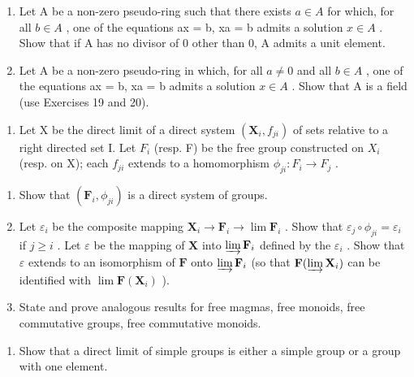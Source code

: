 \begin{enumerate}
\def\labelenumi{\arabic{enumi}.}
\setcounter{enumi}{19}
\item
  Let A be a non-zero pseudo-ring such that there exists \(a \in A\) for which, for all \(b \in A\) , one of the equations ax = b, xa = b admits a solution \(x \in A\) . Show that if A has no divisor of 0 other than 0, A admits a unit element.
\item
  Let A be a non-zero pseudo-ring in which, for all \(a \neq 0\) and all \(b \in A\) , one of the equations ax = b, xa = b admits a solution \(x \in A\) . Show that A is a field (use Exercises 19 and 20).
\end{enumerate}

\BourbakiExercisesSection

\begin{enumerate}
\def\labelenumi{\arabic{enumi}.}
\tightlist
\item
  Let X be the direct limit of a direct system \((\mathbf{X}_{i}, f_{ji})\) of sets relative to a right directed set I. Let \(F_{i}\) (resp. F) be the free group constructed on \(X_{i}\) (resp. on X); each \(f_{ji}\) extends to a homomorphism \(\phi_{ji}: F_{i} \to F_{j}\) .
\end{enumerate}

\begin{enumerate}
\def\labelenumi{(\alph{enumi})}
\item
  Show that \((\mathbf{F}_i,\phi_{ji})\) is a direct system of groups.
\item
  Let \(\varepsilon_{i}\) be the composite mapping \(\mathbf{X}_{i} \to \mathbf{F}_{i} \to \lim \mathbf{F}_{i}\) . Show that \(\varepsilon_{j} \circ \phi_{ji} = \varepsilon_{i}\) if \(j \geqslant i\) . Let \(\varepsilon\) be the mapping of \(\mathbf{X}\) into \(\varinjlim \mathbf{F}_{i}\) defined by the \(\varepsilon_{i}\) . Show that \(\varepsilon\) extends to an isomorphism of \(\mathbf{F}\) onto \(\varinjlim \mathbf{F}_{i}\) (so that \(\mathbf{F}(\varinjlim \mathbf{X}_{i})\) can be identified with \(\lim \mathbf{F}(\mathbf{X}_{i})\) ).
\item
  State and prove analogous results for free magmas, free monoids, free commutative groups, free commutative monoids.
\end{enumerate}

\begin{enumerate}
\def\labelenumi{\arabic{enumi}.}
\setcounter{enumi}{1}
\tightlist
\item
  Show that a direct limit of simple groups is either a simple group or a group with one element.
\end{enumerate}

